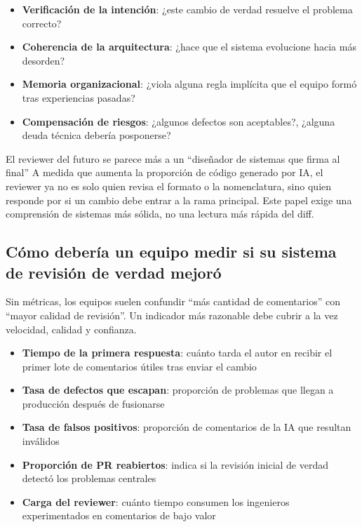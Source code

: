 \documentclass[a4paper]{article}
\begin{document}
\begin{itemize}
    \item \textbf{Verificación de la intención}: ¿este cambio de verdad resuelve el problema correcto?
    \item \textbf{Coherencia de la arquitectura}: ¿hace que el sistema evolucione hacia más desorden?
    \item \textbf{Memoria organizacional}: ¿viola alguna regla implícita que el equipo formó tras experiencias pasadas?
    \item \textbf{Compensación de riesgos}: ¿algunos defectos son aceptables?, ¿alguna deuda técnica debería posponerse?
\end{itemize}

\begin{importantbox}{El reviewer del futuro se parece más a un ``diseñador de sistemas que firma al final''}
A medida que aumenta la proporción de código generado por IA, el reviewer ya no es solo quien revisa el formato o la nomenclatura, sino quien responde por si un cambio debe entrar a la rama principal. Este papel exige una comprensión de sistemas más sólida, no una lectura más rápida del diff.
\end{importantbox}

\subsection{Cómo debería un equipo medir si su sistema de revisión de verdad mejoró}

Sin métricas, los equipos suelen confundir ``más cantidad de comentarios'' con ``mayor calidad de revisión''. Un indicador más razonable debe cubrir a la vez velocidad, calidad y confianza.

\begin{itemize}
    \item \textbf{Tiempo de la primera respuesta}: cuánto tarda el autor en recibir el primer lote de comentarios útiles tras enviar el cambio
    \item \textbf{Tasa de defectos que escapan}: proporción de problemas que llegan a producción después de fusionarse
    \item \textbf{Tasa de falsos positivos}: proporción de comentarios de la IA que resultan inválidos
    \item \textbf{Proporción de PR reabiertos}: indica si la revisión inicial de verdad detectó los problemas centrales
    \item \textbf{Carga del reviewer}: cuánto tiempo consumen los ingenieros experimentados en comentarios de bajo valor
\end{itemize}
\end{document}
